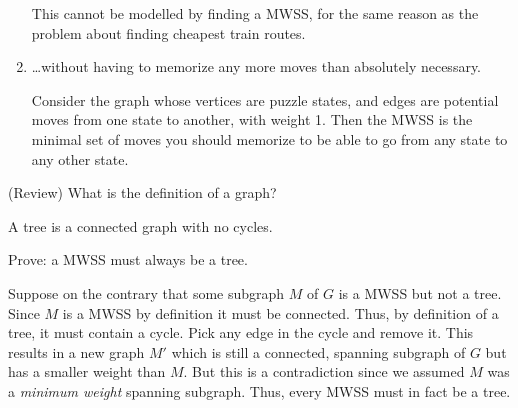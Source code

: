 \documentclass{tufte-handout}
\begin{document}
\begin{questions}
\begin{subquestions}
\begin{enumerate}[label=(\roman*)]
      \begin{answer}
        This cannot be modelled by finding a MWSS, for the same reason
        as the problem about finding cheapest train routes.
      \end{answer}
    \item \dots without having to memorize any more moves than
      absolutely necessary.

      \begin{answer}
        Consider the graph whose vertices are puzzle states, and edges
        are potential moves from one state to another, with weight 1.
        Then the MWSS is the minimal set of moves you should memorize
        to be able to go from any state to any other state.
      \end{answer}
    \end{enumerate}
  \end{subquestions}

\item (Review) What is the definition of a  graph?

  \begin{answer}
    A tree is a connected graph with no cycles.
  \end{answer}
\item \label{q:mwss-tree} Prove: a MWSS must always be a tree. 

  \begin{answer}
    Suppose on the contrary that some subgraph $M$ of $G$ is a MWSS
    but not a tree.  Since $M$ is a MWSS by definition it must be
    connected.  Thus, by definition of a tree, it must contain a
    cycle.  Pick any edge in the cycle and remove it.  This results in
    a new graph $M'$ which is still a connected, spanning subgraph of
    $G$ but has a smaller weight than $M$.  But this is a
    contradiction since we assumed $M$ was a \emph{minimum weight}
    spanning subgraph.  Thus, every MWSS must in fact be a tree.
  \end{answer}
\end{questions}

\pause
\end{document}
